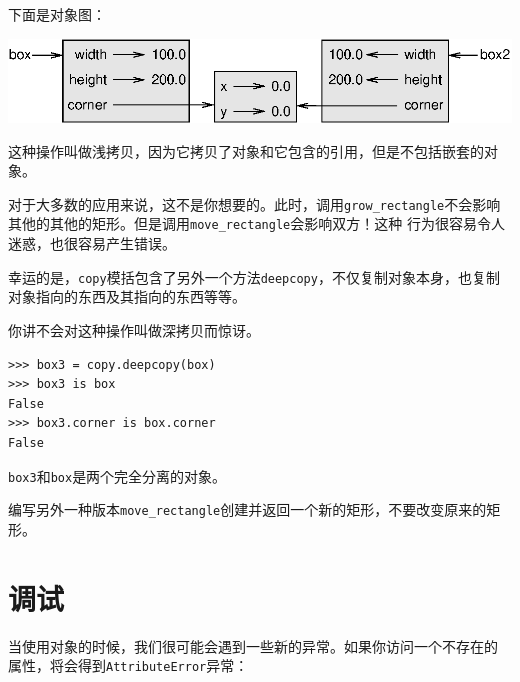 下面是对象图：


\vspace{0.1in}
\beforefig
\centerline{\includegraphics{figs/rectangle2.eps}}
\afterfig
\vspace{0.1in}

这种操作叫做浅拷贝，因为它拷贝了对象和它包含的引用，但是不包括嵌套的对象。


对于大多数的应用来说，这不是你想要的。此时，调用\verb"grow_rectangle"不会影响其他的其他的矩形。但是调用\verb"move_rectangle"会影响双方！这种
行为很容易令人迷惑，也很容易产生错误。


幸运的是，{\tt copy}模括包含了另外一个方法{\tt deepcopy}，不仅复制对象本身，也复制对象指向的东西及其指向的东西等等。

你讲不会对这种操作叫做深拷贝而惊讶。


\beforeverb
\begin{verbatim}
>>> box3 = copy.deepcopy(box)
>>> box3 is box
False
>>> box3.corner is box.corner
False
\end{verbatim}
\afterverb
%

{\tt box3}和{\tt box}是两个完全分离的对象。

\begin{ex}
编写另外一种版本\verb"move_rectangle"创建并返回一个新的矩形，不要改变原来的矩形。
\end{ex}

\section{调试}
\label{hasattr}


当使用对象的时候，我们很可能会遇到一些新的异常。如果你访问一个不存在的
属性，将会得到{\tt AttributeError}异常：


